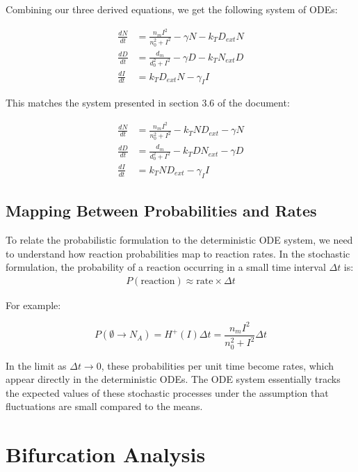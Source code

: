 \documentclass{article}
\begin{document}
\begin{flushleft}
Combining our three derived equations, we get the following system of ODEs:

\begin{align*}
\frac{dN}{dt} &= \frac{n_m I^2}{n_0^2 + I^2} - \gamma N - k_T D_{ext} N \\
\frac{dD}{dt} &= \frac{d_m}{d_0^2 + I^2} - \gamma D - k_T N_{ext} D \\
\frac{dI}{dt} &= k_T D_{ext} N - \gamma_I I
\end{align*}

This matches the system presented in section 3.6 of the document:

\begin{align*}
\frac{dN}{dt} &= \frac{n_m I^2}{n_0^2 + I^2} - k_T N D_{ext} - \gamma N \\
\frac{dD}{dt} &= \frac{d_m}{d_0^2 + I^2} - k_T D N_{ext} - \gamma D \\
\frac{dI}{dt} &= k_T N D_{ext} - \gamma_I I
\end{align*}

\subsection*{Mapping Between Probabilities and Rates}

To relate the probabilistic formulation to the deterministic ODE system, we need to understand how reaction probabilities map to reaction rates. In the stochastic formulation, the probability of a reaction occurring in a small time interval $\Delta t$ is:
\begin{align*}
P(\text{reaction}) \approx \text{rate} \times \Delta t
\end{align*}

For example:

\[
P(\emptyset \rightarrow N_A) = H^+(I) \Delta t = \frac{n_m I^2}{n_0^2 + I^2} \Delta t 
\]

In the limit as $\Delta t \rightarrow 0$, these probabilities per unit time become rates, which appear directly in the deterministic ODEs. The ODE system essentially tracks the expected values of these stochastic processes under the assumption that fluctuations are small compared to the means.

\section{Bifurcation Analysis}
\label{sec:bifurcation}



\end{flushleft}
\end{document}
